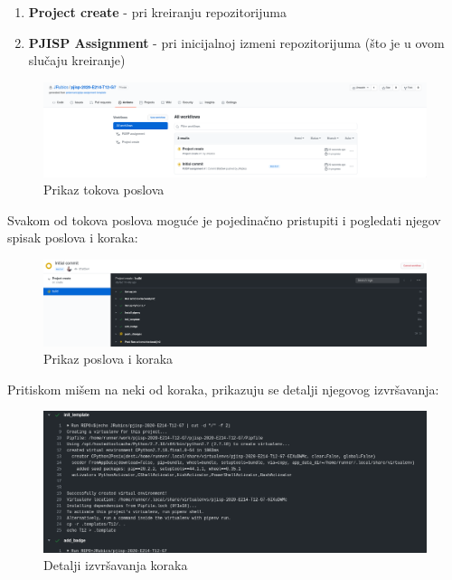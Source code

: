 \documentclass[12pt]{report}
\begin{document}
\begin{enumerate}
    \item \textbf{Project create} - pri kreiranju repozitorijuma
    \item \textbf{PJISP Assignment} - pri inicijalnoj izmeni repozitorijuma (što je u ovom slučaju kreiranje)
\end{enumerate}

\begin{figure}[H]
    \centering
    \includegraphics[width=\linewidth]{images/6.png}
    \caption{Prikaz tokova poslova}
\end{figure}

Svakom od tokova poslova moguće je pojedinačno pristupiti i pogledati njegov spisak poslova i koraka:

\begin{figure}[H]
    \centering
    \includegraphics[width=\linewidth]{images/7.png}
    \caption{Prikaz poslova i koraka}
\end{figure}

Pritiskom mišem na neki od koraka, prikazuju se detalji njegovog izvršavanja:

\begin{figure}[H]
    \centering
    \includegraphics[width=\linewidth]{images/8.png}
    \caption{Detalji izvršavanja koraka}
\end{figure}
\end{document}
